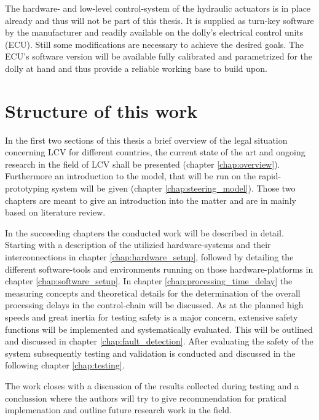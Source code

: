 \documentclass[ExampleMasters.tex]{subfiles}
\begin{document}
The hardware- and low-level control-system of the hydraulic actuators is in place already and thus will not be part of this thesis. It is supplied as turn-key software by the manufacturer and readily available on the dolly's electrical control units (ECU). Still some modifications are necessary to achieve the desired goals. The ECU's software version will be available fully calibrated and parametrized for the dolly at hand and thus provide a reliable working base to build upon. 


\section{Structure of this work}
\label{sec:structure}

In the first two sections of this thesis a brief overview of the legal situation concerning LCV for different countries, the current state of the art and ongoing research in the field of LCV shall be presented (chapter \ref{chap:overview}). Furthermore an introduction to the model, that will be run on the rapid-prototyping system will be given (chapter \ref{chap:steering_model}). Those two chapters are meant to give an introduction into the matter and are in mainly based on literature review. 

In the succeeding chapters the conducted work will be described in detail. Starting with a description of the utilizied hardware-systems and their interconnections in chapter \ref{chap:hardware_setup}, followed by detailing the different software-tools and environments running on those hardware-platforms in chapter \ref{chap:software_setup}. In chapter \ref{chap:processing_time_delay} the measuring concepts and theoretical details for the determination of the overall processing delays in the control-chain will be discussed. As at the planned high speeds and great inertia for testing safety is a major concern, extensive safety functions will be implemented and systematically evaluated. This will be outlined and discussed in chapter \ref{chap:fault_detection}. After evaluating the safety of the system subsequently testing and validation is conducted and discussed in the following chapter  \ref{chap:testing}. 

The work closes with a discussion of the results collected during testing and a conclussion where the authors will try to give recommendation for pratical implemenation and outline future research work in the field.
\end{document}
